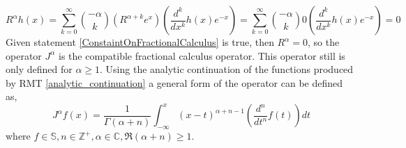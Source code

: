 \documentclass[%
 onecolumn,
 amsmath, amssymb, aps, pra, 10pt
]{revtex4-2}
\begin{document}
\[R^\alpha h(x) = \sum_{k=0}^\infty \binom{-\alpha}{k}\left( R^{\alpha + k}e^x \right)\left( \frac{d^k}{dx^k} h(x)e^{-x}\right) = \sum_{k=0}^\infty \binom{-\alpha}{k} 0 \left( \frac{d^k}{dx^k} h(x)e^{-x}\right) = 0\]
Given statement \eqref{ConstaintOnFractionalCalculus} is true, then $R^\alpha = 0$, so the operator $J^{\alpha}$ is the compatible fractional calculus operator. This operator still is only defined for $\mathfrak{\alpha} \geq 1$. Using the analytic continuation of the functions produced by RMT \eqref{analytic_continuation} a general form of the operator can be defined as,
\begin{equation}
J^{\alpha}f(x) = \frac{1}{\Gamma(\alpha+n)}\int_{-\infty}^x (x-t)^{\alpha+n-1}\left( \frac{d^n}{dt^n} f(t) \right)dt
\label{fractional_calculus}
\end{equation}
where $f \in \mathbb{S}, n \in \mathbb{Z}^+, \alpha \in \mathbb{C}, \mathfrak{R}(\alpha + n) \geq 1$.
\end{document}
